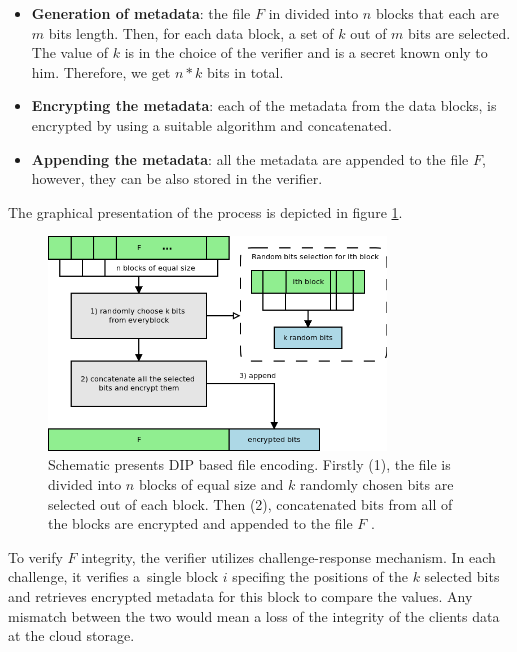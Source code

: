 \begin{itemize}
	\item \textbf{Generation of metadata}: the file $F$ in divided into $n$
	blocks that each are $m$ bits length. Then, for each data block, a set of
	$k$ out of $m$ bits are selected. The value of $k$ is in the choice of the
	verifier and is a secret known only to him. Therefore, we get $n*k$ bits in
	total.
	\item \textbf{Encrypting the metadata}: each of the metadata from the data
	blocks, is encrypted by using a suitable algorithm and concatenated.
	\item \textbf{Appending the metadata}: all the metadata are appended to the
	file $F$, however, they can be also stored in the verifier.
\end{itemize}

The graphical presentation of the process is depicted in figure \ref{fig:dip-schematic}.\\

\begin{figure}[h!]
	\centering
	\includegraphics[width=0.8\textwidth]{images/dip-schematic.png}
	\caption{Schematic presents DIP based file encoding. Firstly (1), the file is
	divided into $n$ blocks of equal size and $k$ randomly chosen bits are selected
	out of each block. Then (2), concatenated bits from all of the blocks are encrypted
	and appended to the file $F$ \cite{dip}.}
	\label{fig:dip-schematic}
\end{figure}

To verify $F$ integrity, the verifier utilizes challenge-response mechanism. In
each challenge, it verifies a~single block $i$ specifing the positions of the
$k$ selected bits and retrieves encrypted metadata for this block to compare
the values. Any mismatch between the two would mean a loss of the integrity of
the clients data at the cloud storage.\\

